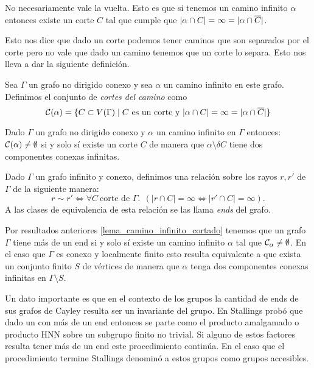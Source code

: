 \documentclass[tesis.tex]{subfiles}
\begin{document}
No necesariamente vale la vuelta.
Esto es que si tenemos un camino infinito $\alpha$ entonces existe un corte $C$ tal que cumple que $|\alpha \cap C| = \infty = |\alpha \cap \overline C|$.

Esto nos dice que dado un corte podemos tener caminos que son separados por el corte pero no vale que dado un camino tenemos que un corte lo separa.
Esto nos lleva a dar la siguiente definición.

\begin{deff}
	Sea $\Gamma$ un grafo no dirigido conexo y sea $\alpha$ un camino infinito en este grafo.
	Definimos el conjunto de \emph{cortes del camino} como 
	\[
	{\cal C}(\alpha) = \{ C \subset V(\Gamma) \mid  C \ \text{es un corte y} \ |\alpha \cap C| = \infty = |\alpha \cap \overline C| \}
	\] 
\end{deff}

\begin{obs}
	Dado $\Gamma$ un grafo no dirigido conexo y $\alpha$ un camino infinito en $\Gamma$ entonces: ${\cal C}(\alpha) \neq \emptyset$ si y solo sí existe un corte $C$ de manera que $\alpha \setminus \delta C$ tiene dos componentes conexas infinitas.
\end{obs}


\begin{deff}
	Dado $\Gamma$ un grafo infinito y conexo,
	definimos una relación sobre los rayos $ r,r' $ de $\Gamma$ de la siguiente manera:
	\[
	r \sim r' \iff \forall C \ \text{corte de $\Gamma$}. \ \ 
	(|r \cap C| = \infty \iff |r' \cap C| = \infty). 
	\]
	A las clases de equivalencia de esta relación se las llama \emph{ends} del grafo.
\end{deff}

Por resultados anteriores \ref{lema_camino_infinito_cortado} tenemos que un grafo $\Gamma$ tiene más de un end si y solo sí existe un camino infinito $\alpha$ tal que ${\cal C}_{\alpha} \neq \emptyset$.
En el caso que $\Gamma$ es conexo y localmente finito esto resulta equivalente a que exista un conjunto finito $S$ de vértices de manera que $\alpha$ tenga dos componentes conexas infinitas en $\Gamma \setminus S$.

Un dato importante es que en el contexto de los grupos la cantidad de ends de sus grafos de Cayley resulta ser un invariante del grupo.
En \cite{stallings1971group} Stallings probó que dado un \fg con más de un end entonces se parte como el producto amalgamado o producto HNN sobre un subgrupo finito no trivial.
Si alguno de estos factores resulta tener más de un end este procedimiento continúa.
En el caso que el procedimiento termine Stallings denominó a estos grupos como grupos accesibles. 
\end{document}

